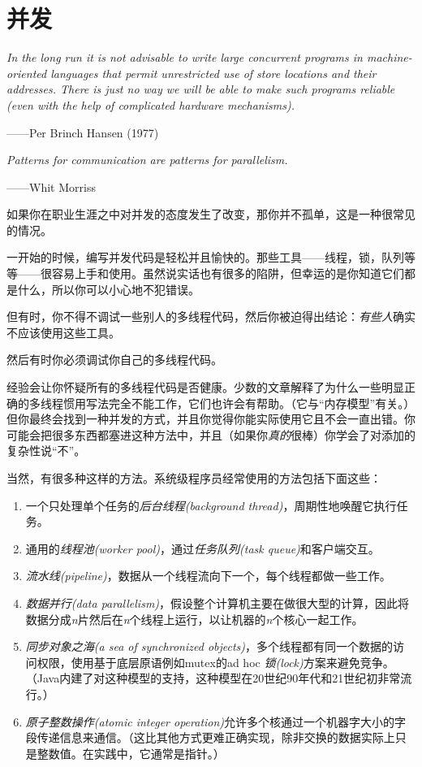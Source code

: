 \chapter{并发}\label{ch19}

\emph{In the long run it is not advisable to write large concurrent programs in machine-oriented languages that permit unrestricted use of store locations and their addresses. There is just no way we will be able to make such programs reliable (even with the help of complicated hardware mechanisms).}

\begin{flushright}
    ——Per Brinch Hansen (1977)
\end{flushright}

\emph{Patterns for communication are patterns for parallelism.}

\begin{flushright}
    ——Whit Morriss
\end{flushright}

如果你在职业生涯之中对并发的态度发生了改变，那你并不孤单，这是一种很常见的情况。

一开始的时候，编写并发代码是轻松并且愉快的。那些工具——线程，锁，队列等等——很容易上手和使用。虽然说实话也有很多的陷阱，但幸运的是你知道它们都是什么，所以你可以小心地不犯错误。

但有时，你不得不调试一些别人的多线程代码，然后你被迫得出结论：\emph{有些人}确实不应该使用这些工具。

然后有时你必须调试你自己的多线程代码。

经验会让你怀疑所有的多线程代码是否健康。少数的文章解释了为什么一些明显正确的多线程惯用写法完全不能工作，它们也许会有帮助。（它与“内存模型”有关。）但你最终会找到一种并发的方式，并且你觉得你能实际使用它且不会一直出错。你可能会把很多东西都塞进这种方法中，并且（如果你\emph{真的}很棒）你学会了对添加的复杂性说“不”。

当然，有很多种这样的方法。系统级程序员经常使用的方法包括下面这些：
\begin{enumerate}
    \item 一个只处理单个任务的\emph{后台线程(background thread)}，周期性地唤醒它执行任务。
    \item 通用的\emph{线程池(worker pool)}，通过\emph{任务队列(task queue)}和客户端交互。
    \item \emph{流水线(pipeline)}，数据从一个线程流向下一个，每个线程都做一些工作。
    \item \emph{数据并行(data parallelism)}，假设整个计算机主要在做很大型的计算，因此将数据分成\emph{n}片然后在\emph{n}个线程上运行，以让机器的\emph{n}个核心一起工作。
    \item \emph{同步对象之海(a sea of synchronized objects)}，多个线程都有同一个数据的访问权限，使用基于底层原语例如mutex的ad hoc \emph{锁(lock)}方案来避免竞争。（Java内建了对这种模型的支持，这种模型在20世纪90年代和21世纪初非常流行。）
    \item \emph{原子整数操作(atomic integer operation)}允许多个核通过一个机器字大小的字段传递信息来通信。（这比其他方式更难正确实现，除非交换的数据实际上只是整数值。在实践中，它通常是指针。）
\end{enumerate}

